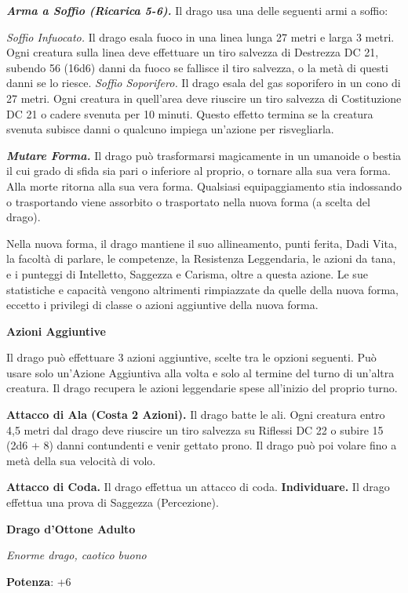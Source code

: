 \begin{multicols}{2}
\emph{\textbf{Arma a Soffio (Ricarica 5-6).}} Il drago usa una delle
seguenti armi a soffio:

\emph{Soffio Infuocato.} Il drago esala fuoco in una linea lunga 27
metri e larga 3 metri. Ogni creatura sulla linea deve effettuare un tiro
salvezza di Destrezza DC 21, subendo 56 (16d6) danni da fuoco se
fallisce il tiro salvezza, o la metà di questi danni se lo riesce.
\emph{Soffio Soporifero.} Il drago esala del gas soporifero in un cono
di 27 metri. Ogni creatura in quell'area deve riuscire un tiro salvezza
di Costituzione DC 21 o cadere svenuta per 10 minuti. Questo effetto
termina se la creatura svenuta subisce danni o qualcuno impiega
un'azione per risvegliarla.

\emph{\textbf{Mutare Forma.}} Il drago può trasformarsi magicamente in
un umanoide o bestia il cui grado di sfida sia pari o inferiore al
proprio, o tornare alla sua vera forma. Alla morte ritorna alla sua vera
forma. Qualsiasi equipaggiamento stia indossando o trasportando viene
assorbito o trasportato nella nuova forma (a scelta del drago).

Nella nuova forma, il drago mantiene il suo allineamento, punti ferita,
Dadi Vita, la facoltà di parlare, le competenze, la Resistenza
Leggendaria, le azioni da tana, e i punteggi di Intelletto, Saggezza e
Carisma, oltre a questa azione. Le sue statistiche e capacità vengono
altrimenti rimpiazzate da quelle della nuova forma, eccetto i privilegi
di classe o azioni aggiuntive della nuova forma.

\textbf{Azioni Aggiuntive}

Il drago può effettuare 3 azioni aggiuntive, scelte tra le opzioni
seguenti. Può usare solo un'Azione Aggiuntiva alla volta e solo al
termine del turno di un'altra creatura. Il drago recupera le azioni
leggendarie spese all'inizio del proprio turno.

\textbf{Attacco di Ala (Costa 2 Azioni).} Il drago batte le ali. Ogni
creatura entro 4,5 metri dal drago deve riuscire un tiro salvezza su Riflessi DC 22 o subire 15 (2d6 + 8) danni contundenti e venir gettato
prono. Il drago può poi volare fino a metà della sua velocità di volo.

\textbf{Attacco di Coda.} Il drago effettua un attacco di coda.
\textbf{Individuare.} Il drago effettua una prova di Saggezza
(Percezione).

\textbf{Drago d'Ottone Adulto}

\emph{Enorme drago, caotico buono}

\textbf{Potenza}: +6


\end{multicols}
